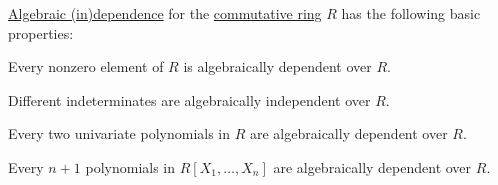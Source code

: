 \begin{proposition}\label{thm:def:algebraic_dependence}
  \hyperref[def:algebraic_dependence]{Algebraic (in)dependence} for the \hyperref[def:ring/commutative]{commutative ring} \( R \) has the following basic properties:
  \begin{thmenum}
     Every nonzero element of \( R \) is algebraically dependent over \( R \).

     Different indeterminates are algebraically independent over \( R \).

     Every two univariate polynomials in \( R \) are algebraically dependent over \( R \).

     Every \( n + 1 \) polynomials in \( R[X_1, \ldots, X_n] \) are algebraically dependent over \( R \).
  \end{thmenum}
\end{proposition}
